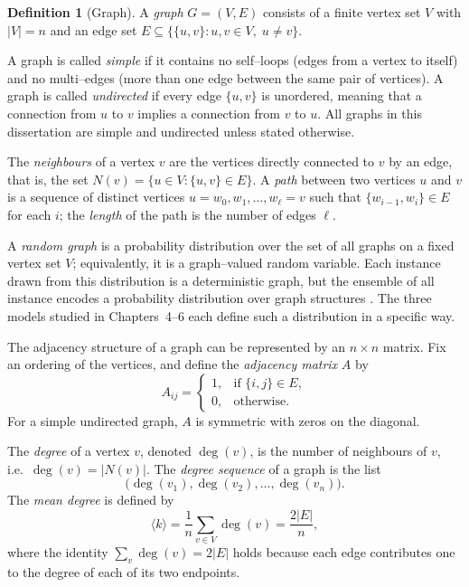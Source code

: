 \documentclass[12pt, a4paper]{report}
\theoremstyle{definition}
\newtheorem{definition}{Definition}[chapter]
\theoremstyle{plain}
\theoremstyle{remark}
\begin{document}
\begin{definition}[Graph]
  A \emph{graph} $G = (V, E)$ consists of a finite vertex set $V$
  with $|V| = n$ and an edge set
  $E \subseteq \bigl\{\{u,v\} : u,v \in V,\; u \neq v\bigr\}$.
\end{definition}

A graph is called \emph{simple} if it contains no self--loops
(edges from a vertex to itself) and no multi--edges (more than
one edge between the same pair of vertices). A graph is called
\emph{undirected} if every edge $\{u,v\}$ is unordered, meaning
that a connection from $u$ to $v$ implies a
connection from $v$ to $u$. All graphs in this dissertation are
simple and undirected unless stated otherwise.

The \emph{neighbours} of a vertex $v$ are the vertices directly
connected to $v$ by an edge, that is, the set
$N(v) = \{u \in V : \{u,v\} \in E\}$.
A \emph{path} between two vertices $u$ and $v$ is a sequence of
distinct vertices $u = w_0, w_1, \dots, w_\ell = v$ such that
$\{w_{i-1}, w_i\} \in E$ for each $i$; the \emph{length} of the
path is the number of edges $\ell$.

A \emph{random graph} is a probability distribution over the set
of all graphs on a fixed vertex set $V$; equivalently, it is a
graph--valued random variable. Each instance drawn from this
distribution is a deterministic graph, but the
ensemble of all instance encodes a probability distribution
over graph structures \cite{hofstad2017}. The three models
studied in Chapters~4--6 each define such a distribution in a
specific way.


The adjacency structure of a graph can be represented by an 
$n \times n$ matrix. Fix an ordering of the vertices, and 
define the \emph{adjacency matrix} $A$ by
\[
  A_{ij} =
  \begin{cases}
    1, & \text{if } \{i,j\} \in E,\\
    0, & \text{otherwise}.
  \end{cases}
\]
For a simple undirected graph, $A$ is symmetric with zeros on
the diagonal.

The \emph{degree} of a vertex $v$, denoted $\deg(v)$, is the 
number of neighbours of $v$, i.e.\ $\deg(v) = |N(v)|$.
The \emph{degree sequence} of a graph is the list
\[
  \bigl(\deg(v_1), \deg(v_2), \dots, \deg(v_n)\bigr).
\]
The \emph{mean degree} is defined by
\[
  \langle k \rangle
  = \frac{1}{n} \sum_{v \in V} \deg(v)
  = \frac{2|E|}{n},
\]
where the identity $\sum_v \deg(v) = 2|E|$ holds because each
edge contributes one to the degree of each of its two endpoints.
\end{document}
